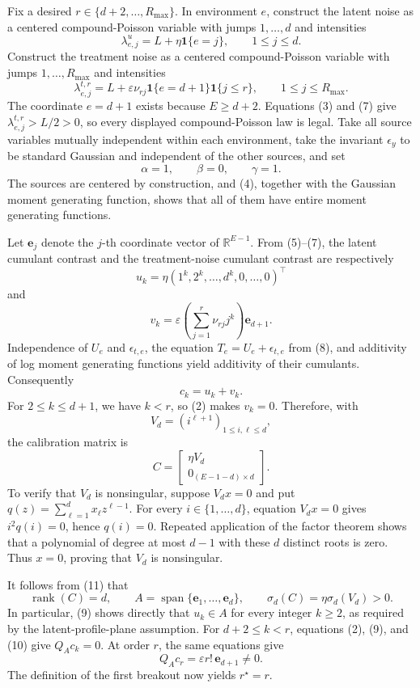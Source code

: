 Fix a desired \(r\in\{d+2,\ldots,R_{\max}\}\).  In environment \(e\), construct the latent noise as a centered compound-Poisson variable with jumps \(1,\ldots,d\) and intensities
\[
 \lambda^{u}_{e,j}=L+\eta\mathbf 1\{e=j\},
 \qquad 1\leq j\leq d.
 \tag{6}
\]
Construct the treatment noise as a centered compound-Poisson variable with jumps \(1,\ldots,R_{\max}\) and intensities
\[
 \lambda^{t,r}_{e,j}
 =L+\varepsilon\nu_{rj}\mathbf 1\{e=d+1\}\mathbf 1\{j\leq r\},
 \qquad 1\leq j\leq R_{\max}.
 \tag{7}
\]
The coordinate \(e=d+1\) exists because \(E\geq d+2\).  Equations (3) and (7) give \(\lambda^{t,r}_{e,j}>L/2>0\), so every displayed compound-Poisson law is legal.  Take all source variables mutually independent within each environment, take the invariant \(\epsilon_y\) to be standard Gaussian and independent of the other sources, and set
\[
 \alpha=1,
 \qquad \beta=0,
 \qquad \gamma=1.
 \tag{8}
\]
The sources are centered by construction, and (4), together with the Gaussian moment generating function, shows that all of them have entire moment generating functions.

Let \(\mathbf e_j\) denote the \(j\)-th coordinate vector of \(\mathbb R^{E-1}\).  From (5)--(7), the latent cumulant contrast and the treatment-noise cumulant contrast are respectively
\[
 u_k=\eta(1^k,2^k,\ldots,d^k,0,\ldots,0)^\top
\]
and
\[
 v_k
 =\varepsilon\left(\sum_{j=1}^{r}\nu_{rj}j^k\right)\mathbf e_{d+1}.
 \tag{9}
\]
Independence of \(U_e\) and \(\epsilon_{t,e}\), the equation \(T_e=U_e+\epsilon_{t,e}\) from (8), and additivity of log moment generating functions yield additivity of their cumulants.  Consequently
\[
 c_k=u_k+v_k.
 \tag{10}
\]
For \(2\leq k\leq d+1\), we have \(k<r\), so (2) makes \(v_k=0\).  Therefore, with
\[
 V_d=(i^{\ell+1})_{1\leq i,\ell\leq d},
\]
the calibration matrix is
\[
 C=
 \begin{bmatrix}
  \eta V_d\\
  0_{(E-1-d)\times d}
 \end{bmatrix}.
 \tag{11}
\]
To verify that \(V_d\) is nonsingular, suppose \(V_dx=0\) and put \(q(z)=\sum_{\ell=1}^d x_\ell z^{\ell-1}\).  For every \(i\in\{1,\ldots,d\}\), equation \(V_dx=0\) gives \(i^2q(i)=0\), hence \(q(i)=0\).  Repeated application of the factor theorem shows that a polynomial of degree at most \(d-1\) with these \(d\) distinct roots is zero.  Thus \(x=0\), proving that \(V_d\) is nonsingular.

It follows from (11) that
\[
 \operatorname{rank}(C)=d,
 \qquad
 A=\operatorname{span}\{\mathbf e_1,\ldots,\mathbf e_d\},
 \qquad
 \sigma_d(C)=\eta\sigma_d(V_d)>0.
 \tag{12}
\]
In particular, (9) shows directly that \(u_k\in A\) for every integer \(k\geq2\), as required by the latent-profile-plane assumption.  For \(d+2\leq k<r\), equations (2), (9), and (10) give \(Q_Ac_k=0\).  At order \(r\), the same equations give
\[
 Q_Ac_r
 =\varepsilon r!\,\mathbf e_{d+1}\neq0.
 \tag{13}
\]
The definition of the first breakout now yields \(r^\star=r\).

